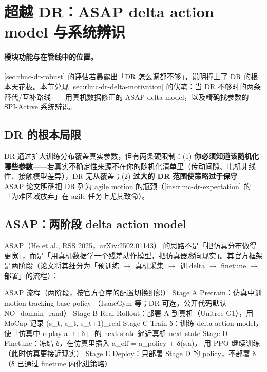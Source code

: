 \section{超越 DR：ASAP delta action model 与系统辨识}
\label{sec:rlmc-dr-beyond}

\paragraph{模块功能与在管线中的位置。}\cref{sec:rlmc-dr-robust} 的评估若暴露出「DR 怎么调都不够」，说明撞上了 DR 的根本天花板。本节兑现 \cref{sec:rlmc-dr-delta-motivation} 的伏笔：当 DR 不够时的两条替代/互补路线——用真机数据修正的 ASAP delta model，以及精确找参数的 SPI-Active 系统辨识。

\subsection{DR 的根本局限}
\label{sec:rlmc-dr-beyond-limit}

DR 通过扩大训练分布覆盖真实参数，但有两条硬限制：(1) \textbf{你必须知道该随机化哪些参数}——若真实不确定性来源不在你的随机化清单里（传动间隙、电机非线性、接触模型差异），DR 无从覆盖；(2) \textbf{过大的 DR 范围使策略过于保守}——ASAP 论文明确把 DR 列为 agile motion 的瓶颈（\cref{ins:rlmc-dr-expectation} 的「为难区域放弃」在 agile 任务上尤其致命）。

\subsection{ASAP：两阶段 delta action model}
\label{sec:rlmc-dr-beyond-asap}

ASAP（He et al., RSS 2025，arXiv:2502.01143）\cite{asap2025} 的思路不是「把仿真分布做得更宽」，而是「用真机数据学一个残差动作模型，把仿真器\emph{掰}向现实」。其官方框架是两阶段（论文将其细分为「预训练 $\to$ 真机采集 $\to$ 训 delta $\to$ finetune $\to$ 部署」的流程）：

\begin{codebox}{ASAP 流程（两阶段，按官方仓库的配置切换组织）}
Stage A  Pretrain：仿真中训 motion-tracking base policy
         （IsaacGym 等；DR 可选，公开代码默认 NO_domain_rand）
Stage B  Real Rollout：部署 A 到真机（Unitree G1），用 MoCap 记录
         (s_t, a_t, s_{t+1})_real
Stage C  Train δ：训练 delta action model，使「仿真中 replay a_t+δ」
         的 next-state 逼近真机 next-state
Stage D  Finetune：冻结 δ，在仿真里插入 a_eff = a_policy + δ(s,a)，
         用 PPO 继续训练（此时仿真更接近现实）
Stage E  Deploy：只部署 Stage D 的 policy，不部署 δ
         （δ 已通过 finetune 内化进策略）
\end{codebox}

